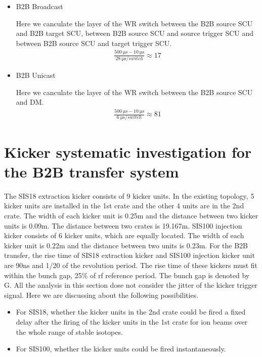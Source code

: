 \begin{itemize}
    \item B2B Broadcast

		Here we canculate the layer of the WR switch between the B2B source \gls{SCU} and B2B target SCU, between B2B source SCU 			and source trigger SCU and between B2B source SCU and target trigger SCU.  
		\begin{equation}
		\begin{aligned}
			\frac{\SI{500}{\us}-\SI{10}{\us}}{\SI{28}{\us/switch}}\approx 17
		\label {num_switch_b}
		\end{aligned}
		\end{equation}
	\item B2B Unicast

		Here we canculate the layer of the WR switch between the B2B source SCU and DM.
		\begin{equation}
		\begin{aligned}
			\frac{\SI{500}{\us}-\SI{10}{\us}}{\SI{6}{\us/switch}}\approx 81
		\label {num_switch_b}
		\end{aligned}
		\end{equation}
\end{itemize}

\section{Kicker systematic investigation for the B2B transfer system}
The SIS18 extraction kicker consists of 9 kicker units. In the existing topology, 5 kicker units are installed in the 1st crate and the other 4 units are in the 2nd crate. The width of each kicker unit is 0.25m and the distance between two kicker units is 0.09m. The distance between two crates is 19.167m. SIS100 injection kicker consists of 6 kicker units, which are equally located. The width of each kicker unit is 0.22m and the distance between two units is 0.23m. For the B2B transfer, the rise time of SIS18 extraction kicker and SIS100 injection kicker unit are 90ns and 1/20 of the revolution period. The rise time of these kickers must fit within the bunch gap, 25$\%$ of rf reference period. The bunch gap is denoted by G. All the analysis in this section dose not consider the jitter of the kicker trigger signal. Here we are discussing about the following possibilities. 
\begin{itemize}
    \item For SIS18, whether the kicker units in the 2nd crate could be fired a fixed delay after the firing of the kicker units in the 1st crate for ion beams over the whole range of stable isotopes. 
    \item For SIS100, whether the kicker units could be fired instantaneously. 
\end{itemize} 

